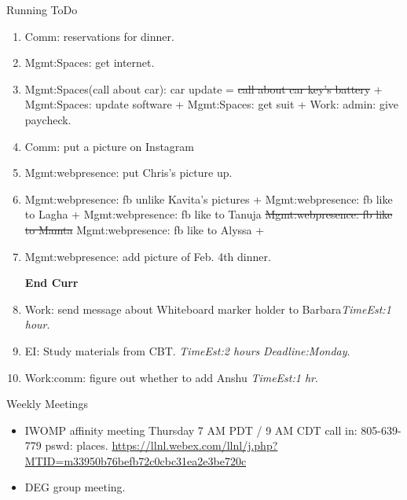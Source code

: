 \documentclass[serif, mathserif, final]{beamer}
\newcommand{\doneTaskNoItem}[1]{\sout{#1}}
\newcommand{\te}[1]{\textit{TimeEst:}\textit{#1}}
\newcommand{\dl}[1]{\textit{Deadline:}\textit{#1}}
\begin{document}
\begin{frame}
\begin{columns}
\begin{column}{0.5\linewidth}
\begin{block}{Running ToDo}
\begin{enumerate}
  \item \tiny Comm: reservations for dinner. 

  \item \tiny Mgmt:Spaces: get internet. 
    
  \item \tiny Mgmt:Spaces(call about car): car update  =
    \doneTaskNoItem{call about car key's battery}  + Mgmt:Spaces:
    update software +  Mgmt:Spaces: get suit +  Work: admin: give
    paycheck.

  \item \tiny Comm: put a picture on Instagram 
  \item \tiny Mgmt:webpresence: put Chris's picture up. 

\item \tiny Mgmt:webpresence: fb unlike Kavita’s pictures  +
  Mgmt:webpresence: fb like to Lagha + Mgmt:webpresence: fb like to Tanuja
  \doneTaskNoItem{ Mgmt:webpresence: fb like
    to Mamta}   Mgmt:webpresence: fb like to Alyssa +
    
  \item \tiny Mgmt:webpresence: add picture of Feb. 4th dinner.  


\textbf{End Curr} 

  \item \tiny Work: send message about Whiteboard marker holder to
    Barbara\te{1 hour}. 
    

  \item \tiny EI: Study materials from CBT.  \te{2 hours} \dl{Monday}.
  \item \tiny Work:comm: figure out whether to add Anshu \te{1 hr}. 
  
    \end{enumerate}
  \end{block}
  
  \begin{block}{Weekly Meetings}
    \begin{itemize}
      \tiny \item \tiny IWOMP affinity meeting Thursday 7 AM PDT / 9 AM
      CDT call in: 805-639-779 pswd: places. \url{https://llnl.webex.com/llnl/j.php?MTID=m33950b76befb72c0cbc31ea2e3be720c}
    \item \tiny DEG group meeting.  
    \end{itemize}
  \end{block} 


\end{column}
\end{columns}
\end{frame}
\end{document}
